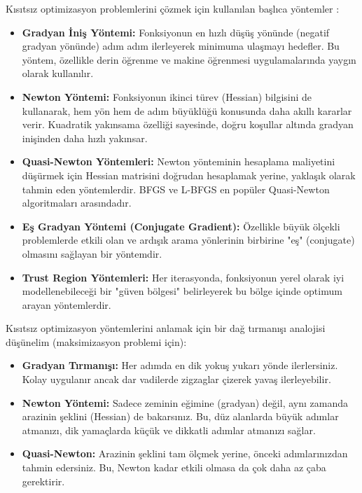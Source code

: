 Kısıtsız optimizasyon problemlerini çözmek için kullanılan başlıca yöntemler :

\begin{itemize}
    \item \textbf{Gradyan İniş Yöntemi:} Fonksiyonun en hızlı düşüş yönünde (negatif gradyan yönünde) adım adım ilerleyerek minimuma ulaşmayı hedefler. Bu yöntem, özellikle derin öğrenme ve makine öğrenmesi uygulamalarında yaygın olarak kullanılır.
    
    \item \textbf{Newton Yöntemi:} Fonksiyonun ikinci türev (Hessian) bilgisini de kullanarak, hem yön hem de adım büyüklüğü konusunda daha akıllı kararlar verir. Kuadratik yakınsama özelliği sayesinde, doğru koşullar altında gradyan inişinden daha hızlı yakınsar.
    
    \item \textbf{Quasi-Newton Yöntemleri:} Newton yönteminin hesaplama maliyetini düşürmek için Hessian matrisini doğrudan hesaplamak yerine, yaklaşık olarak tahmin eden yöntemlerdir. BFGS ve L-BFGS en popüler Quasi-Newton algoritmaları arasındadır.
    
    \item \textbf{Eş Gradyan Yöntemi (Conjugate Gradient):} Özellikle büyük ölçekli problemlerde etkili olan ve ardışık arama yönlerinin birbirine "eş" (conjugate) olmasını sağlayan bir yöntemdir.
    
    \item \textbf{Trust Region Yöntemleri:} Her iterasyonda, fonksiyonun yerel olarak iyi modellenebileceği bir "güven bölgesi" belirleyerek bu bölge içinde optimum arayan yöntemlerdir.
\end{itemize}



\begin{tcolorbox}[title=Dağa Tırmanma Analojisi]
Kısıtsız optimizasyon yöntemlerini anlamak için bir dağ tırmanışı analojisi düşünelim (maksimizasyon problemi için):

\begin{itemize}
    \item \textbf{Gradyan Tırmanışı:} Her adımda en dik yokuş yukarı yönde ilerlersiniz. Kolay uygulanır ancak dar vadilerde zigzaglar çizerek yavaş ilerleyebilir.
    
    \item \textbf{Newton Yöntemi:} Sadece zeminin eğimine (gradyan) değil, aynı zamanda arazinin şeklini (Hessian) de bakarsınız. Bu, düz alanlarda büyük adımlar atmanızı, dik yamaçlarda küçük ve dikkatli adımlar atmanızı sağlar.
    
    \item \textbf{Quasi-Newton:} Arazinin şeklini tam ölçmek yerine, önceki adımlarınızdan tahmin edersiniz. Bu, Newton kadar etkili olmasa da çok daha az çaba gerektirir.
\end{itemize}
\end{tcolorbox}

